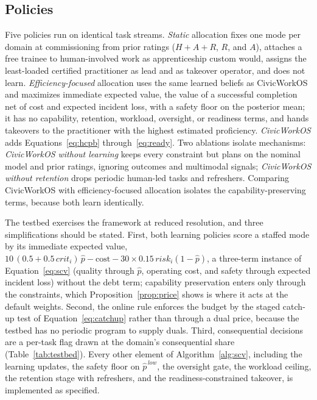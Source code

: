 \documentclass[utf8]{FrontiersinHarvard}
\begin{document}
	\subsection{Policies}
	\label{sec:policies}

	Five policies run on identical task streams. \textit{Static} allocation fixes one mode per domain at commissioning from prior ratings ($H{+}A{+}R$, $R$, and $A$), attaches a free trainee to human-involved work as apprenticeship custom would, assigns the least-loaded certified practitioner as lead and as takeover operator, and does not learn. \textit{Efficiency-focused} allocation uses the same learned beliefs as CivicWorkOS and maximizes immediate expected value, the value of a successful completion net of cost and expected incident loss, with a safety floor on the posterior mean; it has no capability, retention, workload, oversight, or readiness terms, and hands takeovers to the practitioner with the highest estimated proficiency. \textit{CivicWorkOS} adds Equations~\eqref{eq:hcpb} through~\eqref{eq:ready}. Two ablations isolate mechanisms: \textit{CivicWorkOS without learning} keeps every constraint but plans on the nominal model and prior ratings, ignoring outcomes and multimodal signals; \textit{CivicWorkOS without retention} drops periodic human-led tasks and refreshers. Comparing CivicWorkOS with efficiency-focused allocation isolates the capability-preserving terms, because both learn identically.

	The testbed exercises the framework at reduced resolution, and three simplifications should be stated. First, both learning policies score a staffed mode by its immediate expected value, $10\,(0.5+0.5\,crit_i)\,\hat p - \text{cost} - 30\times0.15\,risk_i(1-\hat p)$, a three-term instance of Equation~\eqref{eq:scv} (quality through $\hat p$, operating cost, and safety through expected incident loss) without the debt term; capability preservation enters only through the constraints, which Proposition~\ref{prop:price} shows is where it acts at the default weights. Second, the online rule enforces the budget by the staged catch-up test of Equation~\eqref{eq:catchup} rather than through a dual price, because the testbed has no periodic program to supply duals. Third, consequential decisions are a per-task flag drawn at the domain's consequential share (Table~\ref{tab:testbed}). Every other element of Algorithm~\ref{alg:scv}, including the learning updates, the safety floor on $\hat p^{\,low}$, the oversight gate, the workload ceiling, the retention stage with refreshers, and the readiness-constrained takeover, is implemented as specified.
\end{document}
